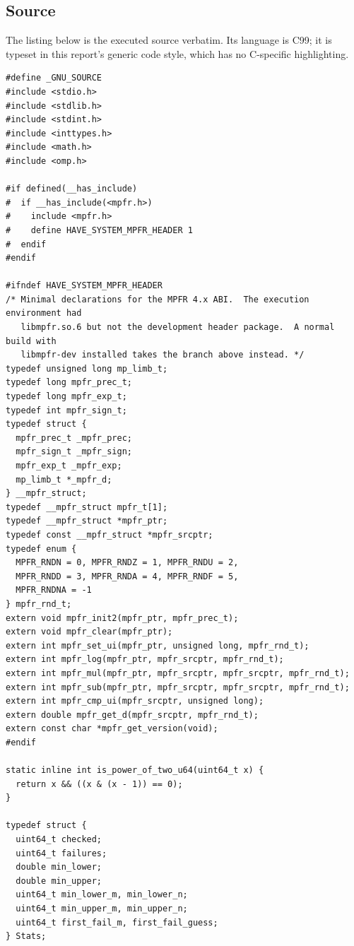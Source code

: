 \documentclass[11pt,oneside]{article}
\theoremstyle{definition}
\theoremstyle{remark}
\begin{document}
\subsection{Source}
\label{a3:verifier-source}

The listing below is the executed source verbatim.  Its language is C99; it is typeset in
this report's generic code style, which has no C-specific highlighting.

\begin{lstlisting}[style=pythonstyle,caption={Directed-rounding verifier (C99, MPFR, OpenMP).}]
#define _GNU_SOURCE
#include <stdio.h>
#include <stdlib.h>
#include <stdint.h>
#include <inttypes.h>
#include <math.h>
#include <omp.h>

#if defined(__has_include)
#  if __has_include(<mpfr.h>)
#    include <mpfr.h>
#    define HAVE_SYSTEM_MPFR_HEADER 1
#  endif
#endif

#ifndef HAVE_SYSTEM_MPFR_HEADER
/* Minimal declarations for the MPFR 4.x ABI.  The execution environment had
   libmpfr.so.6 but not the development header package.  A normal build with
   libmpfr-dev installed takes the branch above instead. */
typedef unsigned long mp_limb_t;
typedef long mpfr_prec_t;
typedef long mpfr_exp_t;
typedef int mpfr_sign_t;
typedef struct {
  mpfr_prec_t _mpfr_prec;
  mpfr_sign_t _mpfr_sign;
  mpfr_exp_t _mpfr_exp;
  mp_limb_t *_mpfr_d;
} __mpfr_struct;
typedef __mpfr_struct mpfr_t[1];
typedef __mpfr_struct *mpfr_ptr;
typedef const __mpfr_struct *mpfr_srcptr;
typedef enum {
  MPFR_RNDN = 0, MPFR_RNDZ = 1, MPFR_RNDU = 2,
  MPFR_RNDD = 3, MPFR_RNDA = 4, MPFR_RNDF = 5,
  MPFR_RNDNA = -1
} mpfr_rnd_t;
extern void mpfr_init2(mpfr_ptr, mpfr_prec_t);
extern void mpfr_clear(mpfr_ptr);
extern int mpfr_set_ui(mpfr_ptr, unsigned long, mpfr_rnd_t);
extern int mpfr_log(mpfr_ptr, mpfr_srcptr, mpfr_rnd_t);
extern int mpfr_mul(mpfr_ptr, mpfr_srcptr, mpfr_srcptr, mpfr_rnd_t);
extern int mpfr_sub(mpfr_ptr, mpfr_srcptr, mpfr_srcptr, mpfr_rnd_t);
extern int mpfr_cmp_ui(mpfr_srcptr, unsigned long);
extern double mpfr_get_d(mpfr_srcptr, mpfr_rnd_t);
extern const char *mpfr_get_version(void);
#endif

static inline int is_power_of_two_u64(uint64_t x) {
  return x && ((x & (x - 1)) == 0);
}

typedef struct {
  uint64_t checked;
  uint64_t failures;
  double min_lower;
  double min_upper;
  uint64_t min_lower_m, min_lower_n;
  uint64_t min_upper_m, min_upper_n;
  uint64_t first_fail_m, first_fail_guess;
} Stats;


\end{lstlisting}
\end{document}

